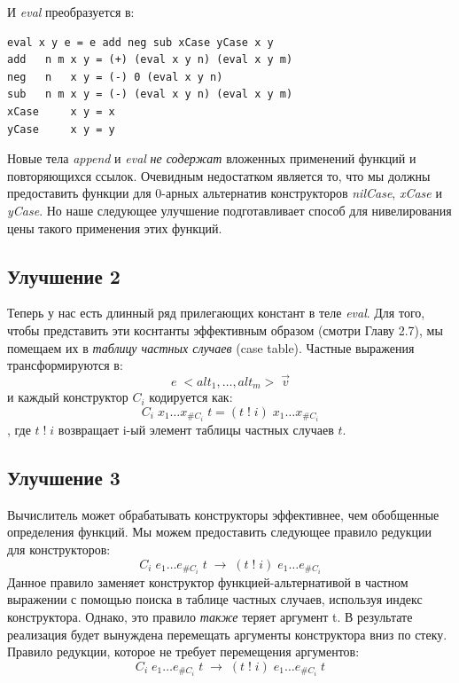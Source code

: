 \documentclass[flenqn, 14pt]{extarticle}
\begin{document}
И \textit{eval} преобразуется в:
\begin{verbatim}
eval x y e = e add neg sub xCase yCase x y
add   n m x y = (+) (eval x y n) (eval x y m)
neg   n   x y = (-) 0 (eval x y n)
sub   n m x y = (-) (eval x y n) (eval x y m)
xCase     x y = x
yCase     x y = y
\end{verbatim}

Новые тела \textit{append} и \textit{eval} \textit{не содержат} вложенных применений функций и повторяющихся ссылок. Очевидным недостатком является то, что мы должны предоставить функции для 0-арных альтернатив конструкторов \textit{nilCase}, \textit{xCase} и \textit{yCase}. Но наше следующее улучшение подготавливает способ для нивелирования цены такого применения этих функций.

\subsection*{Улучшение 2}
Теперь у нас есть длинный ряд прилегающих констант в теле \textit{eval}. Для того, чтобы представить эти коснтанты эффективным образом (смотри Главу 2.7), мы помещаем их в \textit{таблицу частных случаев} (case table). Частные выражения трансформируются в:
$$
e \; <alt_1, \ldots, alt_m> \; \vec{v}
$$
и каждый конструктор $C_i$ кодируется как:
$$
C_i \; x_1 \ldots x_{\#C_i} \; t = (t \; ! \; i) \; x_1 \ldots x_{\#C_i}
$$
, где $t \; ! \; i$ возвращает i-ый элемент таблицы частных случаев $t$.

\subsection*{Улучшение 3}
Вычислитель может обрабатывать конструкторы эффективнее, чем обобщенные определения функций. Мы можем предоставить следующее правило редукции для конструкторов:
$$
C_i \; e_1 \ldots e_{\#C_i} \; t \; \rightarrow \; (t \; ! \; i) \; e_1 \ldots e_{\#C_i}
$$
Данное правило заменяет конструктор функцией-альтернативой в частном выражении с помощью поиска в таблице частных случаев, используя индекс конструктора. Однако, это правило \textit{также} теряет аргумент t. В результате реализация будет вынуждена перемещать аргументы конструктора вниз по стеку. Правило редукции, которое не требует перемещения аргументов:
\begin{equation} \label{eq:reduce_rule_constructors}
C_i \; e_1 \ldots e_{\#C_i} \; t \; \rightarrow \; (t \; ! \; i) \; e_1 \ldots e_{\#C_i} \; t
\end{equation} 
\end{document}
